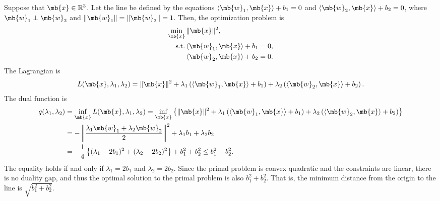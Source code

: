 \begin{exercise}
\begin{enumerate}
            \begin{solution}
                Suppose that $\mb{x}\in\mathbb{R}^3$. Let the line be defined by the equations $\langle \mb{w}_1, \mb{x}\rangle + b_1 = 0$ and $\langle \mb{w}_2, \mb{x}\rangle + b_2 = 0$, where $\mb{w}_1 \perp \mb{w}_2$ and $\|\mb{w}_1\| = \|\mb{w}_2\| = 1$. Then, the optimization problem is
                \begin{align*}
                    \min_{\mb{x}}\, & \|\mb{x}\|^2,                              \\
                    {\rm s.t.}\,    & \langle \mb{w}_1, \mb{x}\rangle + b_1 = 0, \\
                                    & \langle \mb{w}_2, \mb{x}\rangle + b_2 = 0.
                \end{align*}
                The Lagrangian is
                \begin{align*}
                    L(\mb{x}, \lambda_1, \lambda_2) = \|\mb{x}\|^2 + \lambda_1\left(\langle \mb{w}_1, \mb{x}\rangle + b_1\right) + \lambda_2\left(\langle \mb{w}_2, \mb{x}\rangle + b_2\right).
                \end{align*}
                The dual function is
                \begin{align*}
                    q(\lambda_1, \lambda_2) & = \inf_{\mb{x}} L(\mb{x}, \lambda_1, \lambda_2) = \inf_{\mb{x}} \left\{ \|\mb{x}\|^2 + \lambda_1\left(\langle \mb{w}_1, \mb{x}\rangle + b_1\right) + \lambda_2\left(\langle \mb{w}_2, \mb{x}\rangle + b_2\right) \right\} \\
                                            & = -\left\|\frac{\lambda_1\mb{w}_1 + \lambda_2\mb{w}_2}{2}\right\|^2 + \lambda_1b_1 + \lambda_2b_2                                                                                                                         \\
                                            & = -\frac{1}{4}\left\{(\lambda_1 - 2b_1)^2 + (\lambda_2 - 2b_2)^2\right\} + b_1^2 + b_2^2
                    \le b_1^2 + b_2^2.
                \end{align*}
                The equality holds if and only if $\lambda_1 = 2b_1$ and $\lambda_2 = 2b_2$. Since the primal problem is convex quadratic and the constraints are linear, there is no duality gap, and thus the optimal solution to the primal problem is also $b_1^2 + b_2^2$. That is, the minimum distance from the origin to the line is $\sqrt{b_1^2 + b_2^2}$.


\end{solution}
\end{enumerate}
\end{exercise}
